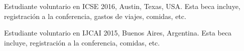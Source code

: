 \item[2016] Estudiante voluntario en ICSE 2016, Austin, Texas, USA. Esta beca incluye,
    registraci\'on a la conferencia, gastos de viajes, comidas, etc.
    
\item[2015] Estudiante voluntario en IJCAI 2015, Buenos Aires, Argentina. Esta beca incluye,
    registraci\'on a la conferencia, comidas, etc.
